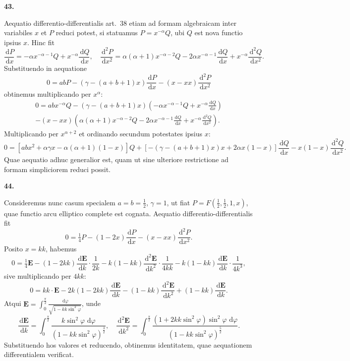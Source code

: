 \documentclass[12pt,a4paper]{article}
\newcommand{\dd}{\,\mathrm{d}}
\begin{document}
\textbf{43.}

Aequatio differentio-differentialis art.\ 38 etiam ad formam algebraicam
inter variabiles $x$ et $P$ reduci potest, si statuamus $P = x^{-\alpha} Q$, ubi $Q$ est nova
functio ipsius $x$. Hinc fit
\[
\frac{\dd P}{\dd x} = -\alpha x^{-\alpha-1} Q + x^{-\alpha} \frac{\dd Q}{\dd x}, \quad
\frac{\dd^2 P}{\dd x^2} = \alpha(\alpha+1) x^{-\alpha-2} Q - 2\alpha x^{-\alpha-1} \frac{\dd Q}{\dd x} + x^{-\alpha} \frac{\dd^2 Q}{\dd x^2}.
\]
Substituendo in aequatione
\[
0 = abP - (\gamma - (a+b+1)x) \frac{\dd P}{\dd x} - (x-xx) \frac{\dd^2 P}{\dd x^2}
\]
obtinemus multiplicando per $x^{\alpha}$:
\begin{multline*}
0 = ab x^{-\alpha} Q - (\gamma - (a+b+1)x)(-\alpha x^{-\alpha-1} Q + x^{-\alpha} \frac{\dd Q}{\dd x}) \\
- (x-xx)(\alpha(\alpha+1) x^{-\alpha-2} Q - 2\alpha x^{-\alpha-1} \frac{\dd Q}{\dd x} + x^{-\alpha} \frac{\dd^2 Q}{\dd x^2}).
\end{multline*}
Multiplicando per $x^{\alpha+2}$ et ordinando secundum potestates ipsius $x$:
\[
0 = [ab x^2 + \alpha \gamma x - \alpha(\alpha+1)(1-x)] Q + [-(\gamma - (a+b+1)x)x + 2\alpha x(1-x)] \frac{\dd Q}{\dd x} - x(1-x) \frac{\dd^2 Q}{\dd x^2}.
\]
Quae aequatio adhuc generalior est, quam ut sine ulteriore restrictione ad formam
simpliciorem reduci possit.

\textbf{44.}

Consideremus nunc casum specialem $a = b = \tfrac{1}{2}$, $\gamma = 1$, ut fiat $P = F(\tfrac{1}{2}, \tfrac{1}{2}, 1, x)$,
quae functio arcu elliptico complete est cognata. Aequatio differentio-differentialis
fit
\[
0 = \tfrac{1}{4} P - (1 - 2x) \frac{\dd P}{\dd x} - (x-xx) \frac{\dd^2 P}{\dd x^2}.
\]
Posito $x = kk$, habemus
\[
0 = \tfrac{1}{4} \boldsymbol{E} - (1-2kk) \frac{\dd \boldsymbol{E}}{\dd k} \cdot \frac{1}{2k} - k(1-kk) \frac{\dd^2 \boldsymbol{E}}{\dd k^2} \cdot \frac{1}{4kk} - k(1-kk) \frac{\dd \boldsymbol{E}}{\dd k} \cdot \frac{1}{4k^3},
\]
sive multiplicando per $4kk$:
\[
0 = kk \cdot \boldsymbol{E} - 2k(1-2kk) \frac{\dd \boldsymbol{E}}{\dd k} - (1-kk) \frac{\dd^2 \boldsymbol{E}}{\dd k^2} + (1-kk) \frac{\dd \boldsymbol{E}}{\dd k}.
\]
Atqui $\boldsymbol{E} = \int_0^{\frac{\pi}{2}} \frac{\dd \varphi}{\sqrt{1 - kk \sin^2 \varphi}}$, unde
\[
\frac{\dd \boldsymbol{E}}{\dd k} = \int_0^{\frac{\pi}{2}} \frac{k \sin^2 \varphi \, \dd \varphi}{(1 - kk \sin^2 \varphi)^{\frac{3}{2}}}, \quad
\frac{\dd^2 \boldsymbol{E}}{\dd k^2} = \int_0^{\frac{\pi}{2}} \frac{(1 + 2kk \sin^2 \varphi) \sin^2 \varphi \, \dd \varphi}{(1 - kk \sin^2 \varphi)^{\frac{5}{2}}}.
\]
Substituendo hos valores et reducendo, obtinemus identitatem, quae aequationem
differentialem verificat.
\end{document}
